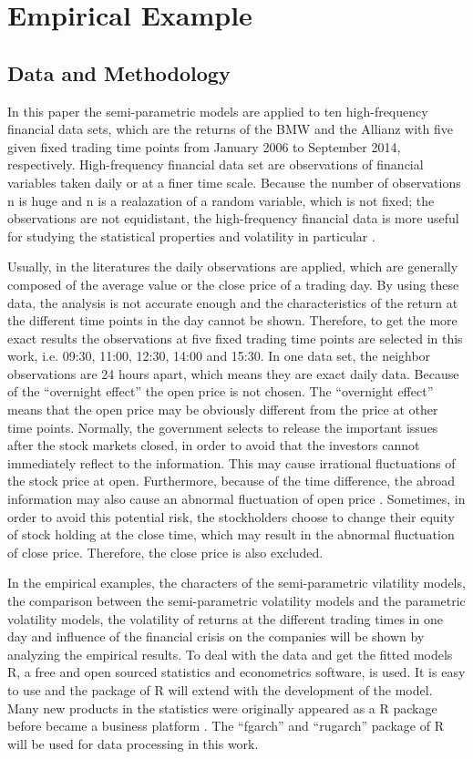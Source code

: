 \chapter{Empirical Example}


\section{Data and Methodology}

In this paper the semi-parametric models are applied to ten high-frequency financial data sets, which are the returns of the BMW and the Allianz with five given fixed trading time points from January 2006 to September 2014, respectively. High-frequency financial data set are observations of financial variables taken daily or at a finer time scale. Because the number of observations n is huge and n is a realazation of a random variable, which is not fixed; the observations are not equidistant, the  high-frequency financial data is more useful for studying the statistical properties and volatility in particular \citep{Zivot2005}.

Usually, in the literatures the daily observations are applied, which are generally composed of the average value or the close price of a trading day. By using these data, the analysis is not accurate enough and the characteristics of the return at the different time points in the day cannot be shown. Therefore, to get the more exact results the observations at five fixed trading time points are selected in this work, i.e. 09:30, 11:00, 12:30, 14:00 and 15:30. In one data set, the neighbor observations are 24 hours apart, which means they are exact daily data. Because of the ``overnight effect'' the open price is not chosen. The ``overnight effect'' means that the open price may be obviously different from the price at other time points. Normally, the government selects to release the important issues after the stock markets closed, in order to avoid that the investors cannot immediately reflect to the information. This may cause irrational fluctuations of the stock price at open. Furthermore, because of the time difference, the abroad information may also cause an abnormal fluctuation of open price \citep{Tsai2012}. Sometimes, in order to avoid this potential risk, the stockholders choose to change their equity of stock holding at the close time, which may result in the abnormal fluctuation of close price. Therefore, the close price is also excluded. 

In the empirical examples, the characters of the semi-parametric vilatility models, the comparison between the semi-parametric volatility models and the parametric volatility models, the volatility of returns at the different trading times in one day and influence of the financial crisis on the companies will be shown by analyzing the empirical results. To deal with the data and get the fitted models R, a free and open sourced statistics and econometrics software, is used. It is easy to use and the package of R will extend with the development of the model. Many new products in the statistics were originally appeared as a R package before became a business platform \citep{Consulting2013}. The ``fgarch'' and ``rugarch'' package of R will be used for data processing in this work.

